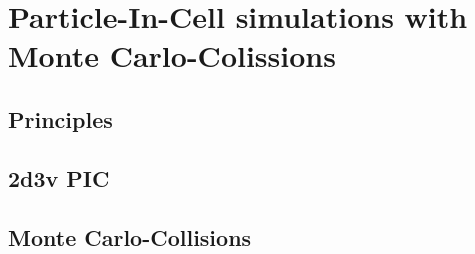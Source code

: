   \section{Particle-In-Cell simulations with Monte Carlo-Colissions}

    \subsection{Principles}

    \subsection{2d3v PIC}

    \subsection{Monte Carlo-Collisions}
